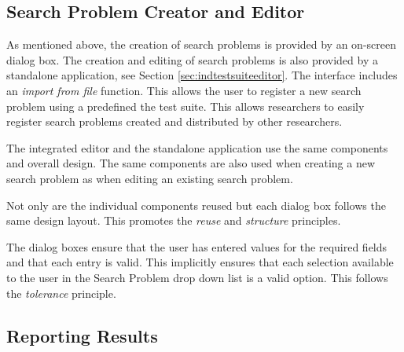 \subsection{Search Problem Creator and Editor}
\label{sec:guisearchcreateed}
As mentioned above, the creation of search problems is provided by an on-screen dialog box.
The creation and editing of search problems is also provided by a standalone application, see Section \ref{sec:indtestsuiteeditor}.
The interface includes an \emph{import from file} function.
This allows the user to register a new search problem using a predefined the test suite.
This allows researchers to easily register search problems created and distributed by other researchers.

The integrated editor and the standalone application use the same components and overall design.
The same components are also used when creating a new search problem as when editing an existing search problem.

Not only are the individual components reused but each dialog box follows the same design layout.
This promotes the \emph{reuse} and \emph{structure} principles.

The dialog boxes ensure that the user has entered values for the required fields and that each entry is valid.
This implicitly ensures that each selection available to the user in the Search Problem drop down list is a valid option.
This follows the \emph{tolerance} principle.

\subsection{Reporting Results}
\label{sec:repres}

